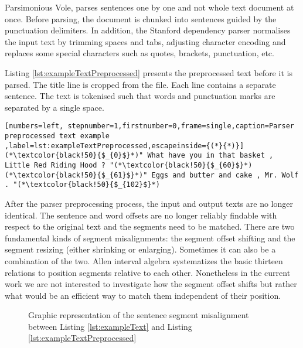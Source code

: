 Parsimonious Vole, parses sentences one by one and not whole text document at once. Before parsing, the document is chunked into sentences guided by the punctuation delimiters. In addition, the Stanford dependency parser normalises the input text by trimming spaces and tabs, adjusting character encoding and replaces some special characters such as quotes, brackets, punctuation, etc.

Listing \ref{lst:exampleTextPreprocessed} presents the preprocessed text before it is parsed. The title line is cropped from the file. Each line contains a separate sentence. The text is tokenised such that words and punctuation marks are separated by a single space.

\begin{lstlisting}[numbers=left, stepnumber=1,firstnumber=0,frame=single,caption=Parser preprocessed text example ,label=lst:exampleTextPreprocessed,escapeinside={(*}{*)}]
(*\textcolor{black!50}{$_{0}$}*)" What have you in that basket , Little Red Riding Hood ? "(*\textcolor{black!50}{$_{60}$}*)
(*\textcolor{black!50}{$_{61}$}*)" Eggs and butter and cake , Mr. Wolf . "(*\textcolor{black!50}{$_{102}$}*)
\end{lstlisting}

After the parser preprocessing process, the input and output texts are no longer identical. The sentence and word offsets are no longer reliably findable with respect to the original text and the segments need to be matched. There are two fundamental kinds of segment misalignments: the segment offset shifting and the segment resizing (either shrinking or enlarging). Sometimes it can also be a combination of the two. Allen interval algebra \citep{Allen1983} systematizes the basic thirteen relations to position segments relative to each other. Nonetheless in the current work we are not interested to investigate how the segment offset shifts but rather what would be an efficient way to match them independent of their position.

\begin{figure}[!ht]
    \centering
    \caption{Graphic representation of the sentence segment misalignment between Listing \ref{lst:exampleText} and Listing \ref{lst:exampleTextPreprocessed} }
    \label{fig:segment-misalignment}
\end{figure}

